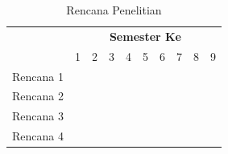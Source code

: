 \begin{table}[h!]
	
	\caption{Rencana Penelitian}
	\begin{tabular}{|l|l|l|l|l|l|l|l|l|l|}
		\hline
		& \multicolumn{9}{c|}{\textbf{Semester Ke}} \\ \cline{2-10} 
		\multirow{-2}{*}{} & 1 & 2 & 3 & 4 & 5 & 6 & 7 & 8 & 9 \\ \hline
		Rencana 1 & \cellcolor[HTML]{000000} & \cellcolor[HTML]{000000} & \cellcolor[HTML]{000000} & \cellcolor[HTML]{000000} & \cellcolor[HTML]{000000} &  &  &  &  \\ \hline
		Rencana 2 &  &  & \cellcolor[HTML]{000000} & \cellcolor[HTML]{000000} & \cellcolor[HTML]{000000} & \cellcolor[HTML]{000000} & \cellcolor[HTML]{000000} &  &  \\ \hline
		Rencana 3 &  &  &  &  &  & \cellcolor[HTML]{000000} & \cellcolor[HTML]{000000} & \cellcolor[HTML]{000000} & \cellcolor[HTML]{000000} \\ \hline
		Rencana 4 &  & \cellcolor[HTML]{000000} & \cellcolor[HTML]{000000}{\color[HTML]{000000} } & \cellcolor[HTML]{000000}{\color[HTML]{000000} } & \cellcolor[HTML]{000000}{\color[HTML]{000000} } & \cellcolor[HTML]{000000}{\color[HTML]{000000} } & \cellcolor[HTML]{000000}{\color[HTML]{000000} } & \cellcolor[HTML]{000000}{\color[HTML]{000000} } & \cellcolor[HTML]{000000}{\color[HTML]{000000} } \\ \hline
	\end{tabular}
\end{table}




